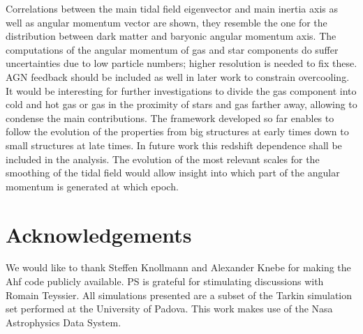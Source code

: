 \documentclass[useAMS,usenatbib]{mn2e}
\begin{document}
Correlations between the main tidal field eigenvector and main inertia axis as
well as angular momentum vector are shown, they resemble the one for the
distribution between dark matter and baryonic angular momentum axis.
%
The computations of the angular momentum of gas and star components do suffer
uncertainties due to low particle numbers; higher resolution is needed to fix
these. AGN feedback should be included as well in later work to constrain
overcooling.
It would be interesting for further investigations to divide the gas component
into cold and hot gas or gas in the proximity of stars and gas farther away,
allowing to condense the main contributions.
The framework developed so far enables to follow the evolution of the
properties from big structures at early times down to small structures at late
times. In future work this redshift dependence shall be included in the
analysis. The evolution of the most relevant scales for the smoothing of the
tidal field would allow insight into which part of the angular momentum is
generated at which epoch.
%
\section*{Acknowledgements}
%
We would like to thank Steffen Knollmann and Alexander Knebe for making the
{\sc Ahf} code publicly available. PS is grateful for stimulating discussions
with Romain Teyssier. All simulations presented are a subset of the {\sc
  Tarkin} simulation set performed at the University of Padova. This work
makes use of the {\sc Nasa} Astrophysics Data System.
%
%
\end{document}
